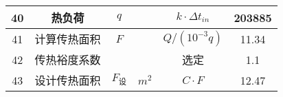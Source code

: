 \begin{table}[H]
{\begin{tabular}{|c|c|c|c|c|c|}
            40   & 热负荷           & $ q $               &           & $ k \cdot \Delta t_{in}$                                                                           & 203885           \\ \hline
            41   & 计算传热面积     & $ F $               &           & $ Q/(10^{-3}q) $                                                                                   & 11.34            \\ \hline
            42   & 传热裕度系数     &                     &           & 选定                                                                                               & 1.1              \\ \hline
            43   & 设计传热面积     & $ F_{\text{设}} $   & $ m^2 $   & $ C \cdot F $                                                                                      & 12.47            \\ \hline
        \end{tabular}
    }
\end{table}

